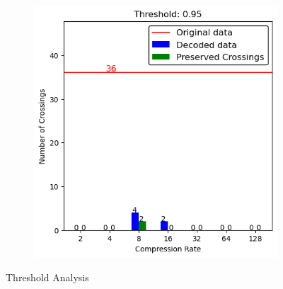 \begin{appendices}
\begin{figure}
\begin{subfigure}{.5\textwidth}
	\end{subfigure}
	\end{figure}
	\begin{figure}
	\ContinuedFloat
	\begin{subfigure}{.5\textwidth}
		\includegraphics[width=\textwidth]{../../Images/spikes_threshold_095.png}
	\end{subfigure}
	\caption{Threshold Analysis}
	\label{appendix:ThresholdAnalysis} 
\end{figure}

\FloatBarrier
\end{appendices}